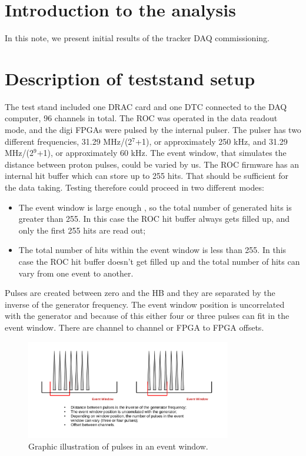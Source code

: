 \section {Introduction to the analysis}

In this note, we present initial results of the tracker DAQ commissioning.
\section{Description of teststand setup}
  The test stand included one DRAC card and one DTC connected to the DAQ computer,
  96 channels in total.
  The ROC was operated in the data readout mode, and the digi FPGAs were pulsed by the internal pulser.
  The pulser has two different frequencies,  31.29 MHz/(2$^7$+1), or approximately 250 kHz,
  and 31.29 MHz/(2$^9$+1), or approximately 60 kHz.
  The event window, that simulates the distance between proton pulses, could be varied by us.
  The ROC firmware has an internal hit buffer which can store up to 255 hits.
  That should be sufficient for the data taking.
  Testing therefore could proceed in two different modes:
  \begin{itemize}
  \item
    The event window is large enough , so the total number of generated hits is greater than 255. In this case
    the ROC hit buffer always gets filled up, and only the first 255 hits are read out;
  \item
    The total number of hits within the event window is less than 255.
    In this case the ROC hit buffer doesn't get filled up and the total number of hits
    can vary from one event to another.
  \end{itemize}
Pulses are created between zero and the HB and they are separated by the inverse of the generator frequency.
The event window position is uncorrelated with the generator and because of this either four or three pulses can fit in the event window.
There are channel to channel or FPGA to FPGA offsets.

\begin{figure}[!h]
\centering
\includegraphics[width =0.8\textwidth]{figures/pdf/sodapdf-converted-1}
\caption{Graphic illustration of pulses in an event window.}
\label{fig:3}
\end{figure}
